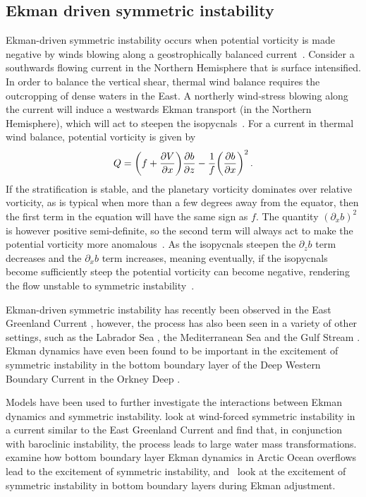 \subsection{Ekman driven symmetric instability}
\label{sec:EkmanInst}
Ekman-driven symmetric instability occurs when potential vorticity is made negative by winds blowing along a geostrophically balanced current~\citep{Thomas2005}. Consider a southwards flowing current in the Northern Hemisphere that is surface intensified. In order to balance the vertical shear, thermal wind balance requires the outcropping of dense waters in the East. A northerly wind-stress blowing along the current will induce a westwards Ekman transport (in the Northern Hemisphere), which will act to steepen the isopycnals~\citep{Allen1996}. For a current in thermal wind balance, potential vorticity is given by
\begin{equation}
    Q = \bigg(f + \pdv{V}{x}\bigg) \pdv{b}{z} - \frac{1}{f} \bigg(\pdv{b}{x} \bigg)^2 \, .
\end{equation}
If the stratification is stable, and the planetary vorticity dominates over relative vorticity, as is typical when more than a few degrees away from the equator, then the first term in the equation will have the same sign as $f$. The quantity $(\partial_x b)^2$ is however positive semi-definite, so the second term will always act to make the potential vorticity more anomalous~\citep{Haine1998}. As the isopycnals steepen the $\partial_zb$ term decreases and the $\partial_x b$ term increases, meaning eventually, if the isopycnals become sufficiently steep the potential vorticity can become negative, rendering the flow unstable to symmetric instability~\citep{Thomas2005}.

Ekman-driven symmetric instability has recently been observed in the East Greenland Current \citep{LeBras2022}, however, the process has also been seen in a variety of other settings, such as the Labrador Sea \citep{Straneo2002}, the Mediterranean Sea \citep{Bosse2021} and the Gulf Stream \citep{Thomas2013}. Ekman dynamics have even been found to be important in the excitement of symmetric instability in the bottom boundary layer of the Deep Western Boundary Current in the Orkney Deep \citep{Spingys2021}.

Models have been used to further investigate the interactions between Ekman dynamics and symmetric instability. \citet{Spall2016} look at wind-forced symmetric instability in a current similar to the East Greenland Current and find that, in conjunction with baroclinic instability, the process leads to large water mass transformations. \citet{Yankovsky2019} examine how bottom boundary layer Ekman dynamics in Arctic Ocean overflows lead to the excitement of symmetric instability, and~\citet{Wenegrat2020} look at the excitement of symmetric instability in bottom boundary layers during Ekman adjustment.


